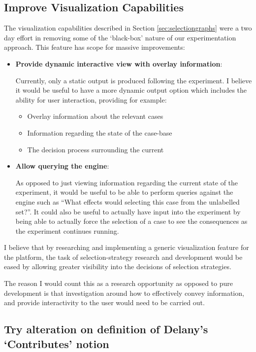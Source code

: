 \documentclass[a4paper,11pt]{report}
\begin{document}
\subsection{Improve Visualization Capabilities}

The visualization capabilities described in Section \ref{sec:selectiongraphs} were a two day effort in removing some of the `black-box' nature of our experimentation approach. This feature has scope for massive improvements:

\begin{itemize}
	\item \textbf{Provide dynamic interactive view with overlay information}:
	
	      Currently, only a static output is produced following the experiment. I believe it would be useful to have a more dynamic output option which includes the ability for user interaction, providing for example:
	      \begin{itemize}
	      	\item Overlay information about the relevant cases
	      	\item Information regarding the state of the case-base
	      	\item The decision process surrounding the current 
	      \end{itemize} 
	\item \textbf{Allow querying the engine}:
	
	      As opposed to just viewing information regarding the current state of the experiment, it would be useful to be able to perform queries against the engine such as ``What effects would selecting this case from the unlabelled set?''. It could also be useful to actually have input into the experiment by being able to actually force the selection of a case to see the consequences as the experiment continues running.
\end{itemize}

I believe that by researching and implementing a generic visualization feature for the platform, the task of selection-strategy research and development would be eased by allowing greater visibility into the decisions of selection strategies.

The reason I would count this as a research opportunity as opposed to pure development is that  investigation around how to effectively convey information, and provide interactivity to the user would need to be carried out.

\subsection{Try alteration on definition of Delany's `Contributes' notion}
\end{document}
